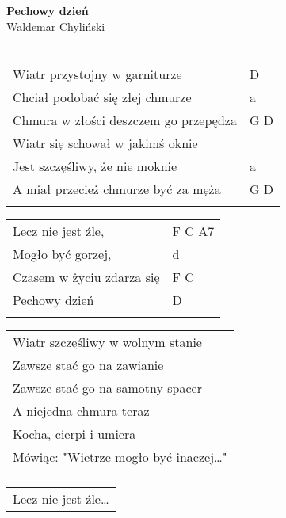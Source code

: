 \documentclass[a5paper]{article}
\begin{document}


\noindent
\fontsize{12pt}{15pt}\selectfont
\textbf{Pechowy dzień} \\
\fontsize{8pt}{10pt}\selectfont
Waldemar Chyliński \\ \\
\fontsize{10pt}{12pt}\selectfont
{}
\begin{tabular}{@{}p{8.00cm}p{3cm}@{}}
\noindent
Wiatr przystojny w garniturze & D \\
Chciał podobać się złej chmurze & a \\
Chmura w złości deszczem go przepędza & G D \\
Wiatr się schował w jakimś oknie &  \\
Jest szczęśliwy, że nie moknie & a \\
A miał przecież chmurze być za męża & G D \\ \\
\end{tabular}

\noindent
\begin{tabular}{@{}p{7.00cm}p{3cm}@{}}
Lecz nie jest źle, & F C A7 \\
Mogło być gorzej, & d \\
Czasem w życiu zdarza się & F C \\
Pechowy dzień & D \\ \\
\end{tabular}

\noindent
\begin{tabular}{@{}p{8.00cm}@{}}
Wiatr szczęśliwy w wolnym stanie \\
Zawsze stać go na zawianie \\
Zawsze stać go na samotny spacer \\
A niejedna chmura teraz \\
Kocha, cierpi i umiera \\
Mówiąc: "Wietrze mogło być inaczej…" \\ \\
\end{tabular}

\noindent
\begin{tabular}{@{}p{7.00cm}@{}}
Lecz nie jest źle…
\end{tabular}
\end{document}
